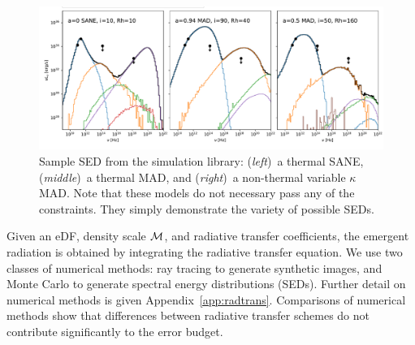 


\begin{figure}
  \centering
  \includegraphics[width=\textwidth,trim=0 12 0 -72]{figures/sample_sed.pdf}
  \caption{Sample SED from the simulation library:
    (\emph{left})~a thermal SANE,
    (\emph{middle})~a thermal MAD, and
    (\emph{right})~a non-thermal variable $\kappa$ MAD.
    Note that these models do not necessary pass any of the constraints.
    They simply demonstrate the variety of possible SEDs.
    }
  \label{fig:sample_SEDs}
\end{figure}

Given an eDF, density scale $\mathcal{M}$, and radiative transfer coefficients, the emergent radiation is obtained by integrating the radiative transfer equation.
We use two classes of numerical methods: ray tracing to generate synthetic images, and Monte Carlo to generate spectral energy distributions (SEDs).
Further detail on numerical methods is given Appendix~\ref{app:radtrans}.
Comparisons of numerical methods \citep{2020ApJ...897..148G, Prather_et_al_2022} show that differences between radiative transfer schemes do not contribute significantly to the error budget.

